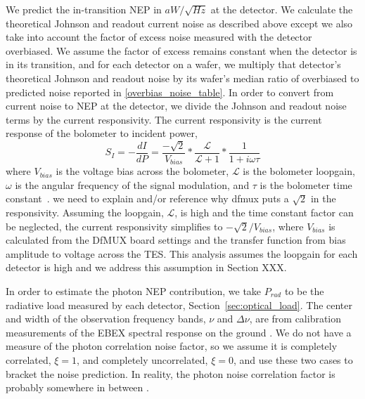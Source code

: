 We predict the in-transition \ac{NEP} in $aW/\sqrt{Hz}$ at the detector. 
We calculate the theoretical Johnson and readout current noise as described above except we also take into account the factor of excess noise measured with the detector overbiased. 
We assume the factor of excess remains constant when the detector is in its transition, and for each detector on a wafer, we multiply that detector's theoretical Johnson and readout noise by its wafer's median ratio of overbiased to predicted noise reported in \TAB\ref{overbias_noise_table}. 
In order to convert from current noise to \ac{NEP} at the detector, we divide the Johnson and readout noise terms by the current responsivity. 
The current responsivity is the current response of the bolometer to incident power,
\begin{equation}
S_I = -\frac{dI}{dP} = \frac{-\sqrt{2}}{V_{bias}} * \frac{\mathcal{L}}{\mathcal{L} + 1} * \frac{1}{1 + i\omega\tau}
\label{eq:current_responsivity}
\end{equation}
where $V_{bias}$ is the voltage bias across the bolometer, $\mathcal{L}$ is the bolometer loopgain, $\omega$ is the angular frequency of the signal modulation, and $\tau$ is the bolometer time constant~\cite{Francois2012}. we need to explain and/or reference why dfmux puts a $\sqrt{2}$ in the responsivity.
Assuming the loopgain, $\mathcal{L}$, is high and the time constant factor can be neglected, the current responsivity simplifies to $-\sqrt{2}/V_{bias}$, where $V_{bias}$ is calculated from the \ac{DfMUX} board settings and the transfer function from bias amplitude to voltage across the \ac{TES}. 
This analysis assumes the loopgain for each detector is high and we address this assumption in Section XXX. 

In order to estimate the photon \ac{NEP} contribution, we take $P_{rad}$ to be the radiative load measured by each detector, Section~\ref{sec:optical_load}. 
The center and width of the observation frequency bands, $\nu$ and $\Delta \nu$, are from calibration measurements of the \ac{EBEX} spectral response on the ground \cite{Zilic2014}. 
We do not have a measure of the photon correlation noise factor, so we assume it is completely correlated, $\xi=1$, and completely uncorrelated, $\xi=0$, and use these two cases to bracket the noise prediction. 
In reality, the photon noise correlation factor is probably somewhere in between \cite{}. 


